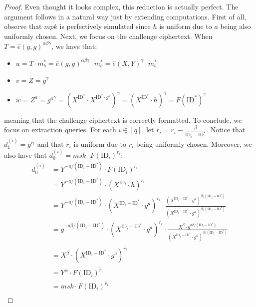 \documentclass[a4paper, 12pt]{report}
\begin{document}
\begin{proof}
        Even thought it looks complex, this reduction is actually perfect. The argument follows in a natural way just by extending computations. First of all, observe that $mpk$ is perfectively simulated since $h$ is uniform due to $a$ being also uniformly chosen. Next, we focus on the challenge ciphertext. When $T = \hat e(g,g)^{\alpha\beta\gamma}$, we have that:
        \begin{itemize}
            \item $u = T \cdot m_b^* = \hat e(g,g)^{\alpha\beta\gamma} \cdot m_b^* = \hat e(X,Y)^{\gamma} \cdot m_b^*$
            \item $v = Z = g^{\gamma}$
            \item $w = Z^a = {g^a}^{\gamma} = (X^{\mathrm{ID}^*} \cdot X^{\mathrm{ID}^* \cdot g^a})^{\gamma} = (X^{\mathrm{ID}^*} \cdot h)^{\gamma} = F(\mathrm{ID}^*)^{\gamma}$ 
        \end{itemize}
        meaning that the challenge ciphertext is correctly formatted. To conclude, we focus on extraction queries. For each $i \in [q]$, let $\tilde{r_i} = r_i - \frac{\beta}{\mathrm{ID}_i - \mathrm{ID}^*}$. Notice that $d_1^{(i)} = g^{\tilde{r_i}}$ and that $\tilde{r_i}$ is uniform due to $r_i$ being uniformly chosen. Moreover, we also have that $d_0^{(i)} = msk \cdot F(\mathrm{ID}_i)^{\tilde{r_i}}$:
        \[\begin{split}
            d_0^{(i)} &= Y^{-a/(\mathrm{ID}_i - \mathrm{ID}^*)} \cdot F(\mathrm{ID}_i)^{r_i} \\
            &= Y^{-a/(\mathrm{ID}_i - \mathrm{ID}^*)} \cdot (X^{\mathrm{ID}_i} \cdot h)^{r_i} \\
            &= Y^{-a/(\mathrm{ID}_i - \mathrm{ID}^*)} \cdot (X^{\mathrm{ID}_i-\mathrm{ID}^*} \cdot g^a)^{r_i} \cdot \frac{(X^{\mathrm{ID}_i - \mathrm{ID}^*} \cdot g^a)^{\beta/(\mathrm{ID}_i - \mathrm{ID}^*)}}{(X^{\mathrm{ID}_i-\mathrm{ID}^*} \cdot g^a)^{\beta/(\mathrm{ID}_i - \mathrm{ID}^*)}}\\
            &= g^{-a\beta/(\mathrm{ID}_i - \mathrm{ID}^*)} \cdot (X^{\mathrm{ID}_i-\mathrm{ID}^*} \cdot g^a)^{r_i} \cdot \frac{X^{\beta} \cdot g^{a\beta/(\mathrm{ID}_i - \mathrm{ID}^*)}}{(X^{\mathrm{ID}_i - \mathrm{ID}^*} \cdot g^a)^{\beta/(\mathrm{ID}_i - \mathrm{ID}^*)}}\\
            &= X^{\beta} \cdot (X^{\mathrm{ID}_i-\mathrm{ID}^*} \cdot g^a)^{\tilde{r_i}}\\
            &= Y^{\alpha} \cdot F(\mathrm{ID}_i)^{\tilde{r_i}}\\
            &= msk \cdot F(\mathrm{ID}_i)^{\tilde{r_i}}\\
        \end{split}\]
    \end{proof}
    
\end{document}

